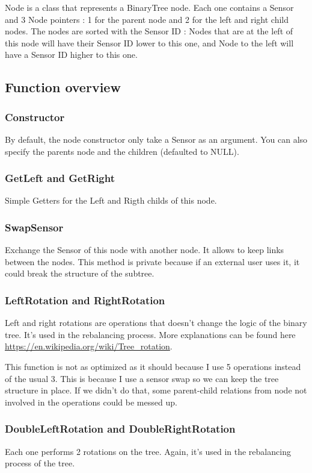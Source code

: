 \documentclass[10pt]{article}
\begin{document}
Node is a class that represents a BinaryTree node. Each one contains a Sensor and 3 Node pointers : 1 for the parent node and 2 for the left and right child nodes. The nodes are sorted with the Sensor ID : Nodes that are at the left of this node will have their Sensor ID lower to this one, and Node to the left will have a Sensor ID higher to this one.
\subsection{Function overview}
\subsubsection*{Constructor}
By default, the node constructor only take a Sensor as an argument. You can also specify the parents node and the children (defaulted to NULL).
\subsubsection*{GetLeft and GetRight}
Simple Getters for the Left and Rigth childs of this node.
\subsubsection*{SwapSensor}
Exchange the Sensor of this node with another node. It allows to keep links between the nodes. This method is private because if an external user uses it, it could break the structure of the subtree.

\subsubsection*{LeftRotation and RightRotation}
Left and right rotations are operations that doesn't change the logic of the binary tree. It's used in the rebalancing process. More explanations can be found here \url{https://en.wikipedia.org/wiki/Tree_rotation}.

This function is not as optimized as it should because I use 5 operations instead of the usual 3. This is because I use a sensor swap so we can keep the tree structure in place. If we didn't do that, some parent-child relations from node not involved in the operations could be messed up.

\subsubsection*{DoubleLeftRotation and DoubleRightRotation}
Each one performs 2 rotations on the tree. Again, it's used in the rebalancing process of the tree.
\end{document}
